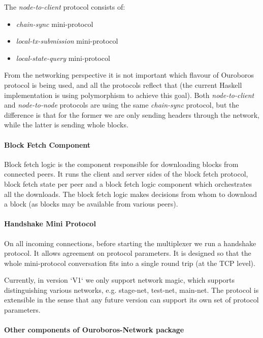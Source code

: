 \documentclass[11pt,a4paper]{article}
\begin{document}
The \emph{node-to-client} protocol consists of:

\begin{itemize}
\item
  \emph{chain-sync} mini-protocol
\item
  \emph{local-tx-submission} mini-protocol
\item
  \emph{local-state-query} mini-protocol
\end{itemize}

From the networking perspective it is not important which flavour of
Ouroboros protocol is being used, and all the protocols reflect that
(the current Haskell implementation is using polymorphism to achieve
this goal). Both \emph{node-to-client} and \emph{node-to-node} protocols
are using the same \emph{chain-sync} protocol, but the difference is
that for the former we are only sending headers through the network,
while the latter is sending whole blocks.

\paragraph{Block Fetch Component}

Block fetch logic is the component responsible for downloading blocks
from connected peers. It runs the client and server sides of the block
fetch protocol, block fetch state per peer and a block fetch logic
component which orchestrates all the downloads. The block fetch logic
makes decisions from whom to download a block (as blocks may be
available from various peers).

\paragraph{Handshake Mini Protocol}

On all incoming connections, before starting the multiplexer we run a
handshake protocol. It allows agreement on protocol parameters. It is
designed so that the whole mini-protocol conversation fits into a single
round trip (at the TCP level).

Currently, in version `V1` we only support network magic, which supports
distinguishing various networks, e.g. stage-net, test-net, main-net. The
protocol is extensible in the sense that any future version can support
its own set of protocol parameters.

\paragraph{Other components of Ouroboros-Network package}
\end{document}
